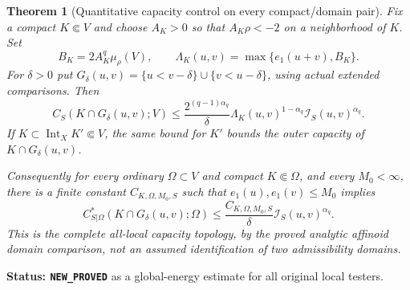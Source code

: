 \documentclass[11pt,a4paper]{article}
\numberwithin{equation}{section}
\newtheorem{theorem}{Theorem}[section]
\theoremstyle{definition}
\theoremstyle{remark}
\begin{document}
\begin{theorem}[Quantitative capacity control on every compact/domain pair]
\label{thm:r11-first-energy-all-local-capacity}
Fix a compact $K\Subset V$ and choose $A_K>0$ so that
$A_K\rho<-2$ on a neighborhood of $K$. Set
\[
 B_K=2A_K^q\mu_\rho(V),\qquad
 \Lambda_K(u,v)=\max\{e_1(u+v),B_K\}.
 \tag{EV6}
\]
For $\delta>0$ put
$G_\delta(u,v)=\{u<v-\delta\}\cup\{v<u-\delta\}$,
using actual extended comparisons. Then
\[
 C_S(K\cap G_\delta(u,v);V)
    \leq\frac{2^{(q-1)\alpha_q}}\delta
          \Lambda_K(u,v)^{1-\alpha_q}
                      \mathscr I_S(u,v)^{\alpha_q}.
 \tag{EV7}
\]
If $K\subset\operatorname{Int}_X K'\Subset V$, the same
bound for $K'$ bounds the outer capacity of
$K\cap G_\delta(u,v)$.

Consequently for every ordinary $\Omega\subset V$ and
compact $K\Subset\Omega$, and every $M_0<\infty$, there
is a finite constant $C_{K,\Omega,M_0,S}$ such that
$e_1(u),e_1(v)\leq M_0$ implies
\[
 C_{S|\Omega}^*(K\cap G_\delta(u,v);\Omega)
       \leq\frac{C_{K,\Omega,M_0,S}}\delta
                            \mathscr I_S(u,v)^{\alpha_q}.
 \tag{EV8}
\]
This is the complete all-local capacity topology, by the
proved analytic affinoid domain comparison, not an assumed
identification of two admissibility domains.
\end{theorem}

\noindent\textbf{Status: \texttt{NEW\_PROVED}} as a
global-energy estimate for all original local testers.
\end{document}
